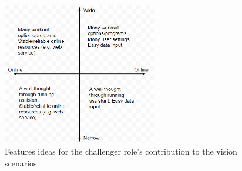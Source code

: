 \begin{figure}[h!]
  \centering
    \includegraphics[width=0.6\textwidth]{Images/axis2.PNG}
    \caption{Features ideas for the challenger role's contribution to the vision scenarios.}
    \label{fig:axis2}
\end{figure}
